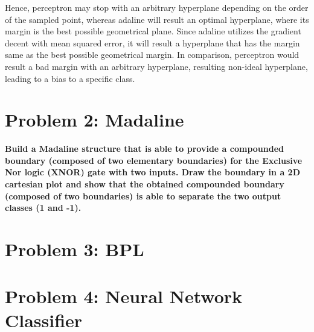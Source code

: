 \documentclass{tron}
\begin{document}
Hence, perceptron may stop with an arbitrary hyperplane depending on the order of the sampled point, whereas adaline will result an optimal hyperplane, where its margin is the best possible geometrical plane. Since adaline utilizes the gradient decent with mean squared error, it will result a hyperplane that has the margin same as the best possible geometrical margin. In comparison, perceptron would result a bad margin with an arbitrary hyperplane, resulting non-ideal hyperplane, leading to a bias to a specific class.



\newpage
\section{Problem 2: Madaline}
\vspace{5pt}
\textbf{Build a Madaline structure that is able to provide a compounded boundary (composed of two elementary boundaries) for the Exclusive Nor logic (XNOR) gate with two inputs. Draw the boundary in a 2D cartesian plot and show that the obtained compounded boundary (composed of two boundaries) is able to separate the two output classes (1 and -1).}



\newpage
\section{Problem 3: BPL}
\vspace{5pt}



\newpage
\section{Problem 4: Neural Network Classifier}
\vspace{5pt}



\end{document}
